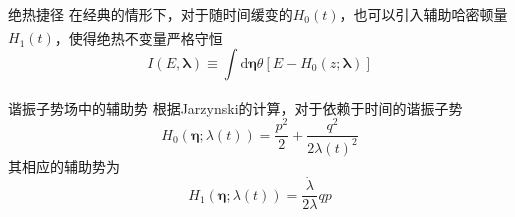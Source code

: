 \documentclass{beamer}
\newcommand{\upcite}[1]{\textsuperscript{\cite{#1}}}  %
\begin{document}
\begin{frame}{绝热捷径}
    在经典的情形下，对于随时间缓变的$H_0 (t)$，也可以引入辅助哈密顿量$H_1 (t)$，使得绝热不变量\upcite{LiuChuan2019}严格守恒
        \begin{equation}
            I(E, \boldsymbol{\lambda}) \equiv \int \mathrm{d} \bm{\eta} \theta\left[E-H_{0}(z ; \boldsymbol{\lambda})\right]
          \label{eq11}
        \end{equation}
        \pause
    \begin{alertblock}{谐振子势场中的辅助势}
        根据Jarzynski的计算\upcite{Jarzynski2013}，对于依赖于时间的谐振子势
        \begin{equation}
            H_{0}(\bm{\eta} ; \lambda(t))=\frac{p^{2}}{2}+\frac{q^2}{2\lambda(t)^{2}}
            \label{eq12}
        \end{equation}
        \pause
        其相应的辅助势为
        \begin{equation}
            H_{1}(\bm{\eta} ; \lambda(t))=\frac{\dot{\lambda}}{2 \lambda} q p
            \label{eq13}
        \end{equation}
    \end{alertblock}
\end{frame}

\end{document}
